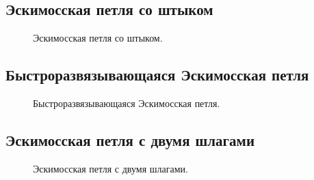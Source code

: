 \subsection{Эскимосская петля со штыком}

\begin{figure}[H]\centering
	\begin{minipage}{1\linewidth}
		\begin{center}
			\tcbox[enhanced jigsaw,colframe=black,opacityframe=0.5,opacityback=0.5]
			{\centering{}}
		\end{center}
	\end{minipage}
\caption{Эскимосская петля со штыком.}
\label{ris:Eskimo_shtyk}
\end{figure}

\subsection{Быстроразвязывающаяся Эскимосская петля}

\begin{figure}[H]\centering
	\begin{minipage}{1\linewidth}
		\begin{center}
			\tcbox[enhanced jigsaw,colframe=black,opacityframe=0.5,opacityback=0.5]
			{\centering{}}
		\end{center}
	\end{minipage}
\caption{Быстроразвязывающаяся Эскимосская петля.}
\label{ris:Eskimo_fast}
\end{figure}

\subsection{Эскимосская петля с двумя шлагами}

\begin{figure}[H]\centering
	\begin{minipage}{1\linewidth}
		\begin{center}
			\tcbox[enhanced jigsaw,colframe=black,opacityframe=0.5,opacityback=0.5]
			{\centering{}}
		\end{center}
	\end{minipage}
\caption{Эскимосская петля с двумя шлагами.}
\label{ris:Eskimo_Double}
\end{figure}

